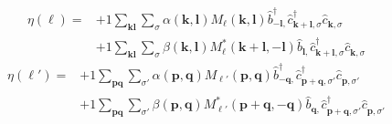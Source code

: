 \begin{align*}
	\eta(\ell) = 	&+1 \sum_{ \mathbf{k} \mathbf{l} } \sum_{ \sigma } \alpha( \mathbf{k}, \mathbf{l} )  M_{\ell}( \mathbf{k}, \mathbf{l} )   \hat{b}_{ -\mathbf{l}, }^\dagger  \hat{c}_{ \mathbf{k}+\mathbf{l}, \sigma }^\dagger  \hat{c}_{ \mathbf{k}, \sigma }^{\phantom{\dagger}}  \\
	&+1 \sum_{ \mathbf{k} \mathbf{l} } \sum_{ \sigma } \beta( \mathbf{k}, \mathbf{l} )  M_{\ell}^*( \mathbf{k}+\mathbf{l}, -\mathbf{l} )   \hat{b}_{ \mathbf{l}, }^{\phantom{\dagger}} \hat{c}_{ \mathbf{k}+\mathbf{l}, \sigma }^\dagger  \hat{c}_{ \mathbf{k}, \sigma }^{\phantom{\dagger}} 
\end{align*}
\begin{align*}
	\eta(\ell') = 	&+1 \sum_{ \mathbf{p} \mathbf{q} } \sum_{ \sigma' } \alpha( \mathbf{p}, \mathbf{q} )  M_{\ell'}( \mathbf{p}, \mathbf{q} )   \hat{b}_{ -\mathbf{q}, }^\dagger  \hat{c}_{ \mathbf{p}+\mathbf{q}, \sigma' }^\dagger  \hat{c}_{ \mathbf{p}, \sigma' }^{\phantom{\dagger}}  \\
	&+1 \sum_{ \mathbf{p} \mathbf{q} } \sum_{ \sigma' } \beta( \mathbf{p}, \mathbf{q} )  M_{\ell'}^*( \mathbf{p}+\mathbf{q}, -\mathbf{q} )   \hat{b}_{ \mathbf{q}, }^{\phantom{\dagger}} \hat{c}_{ \mathbf{p}+\mathbf{q}, \sigma' }^\dagger  \hat{c}_{ \mathbf{p}, \sigma' }^{\phantom{\dagger}} 
\end{align*}

